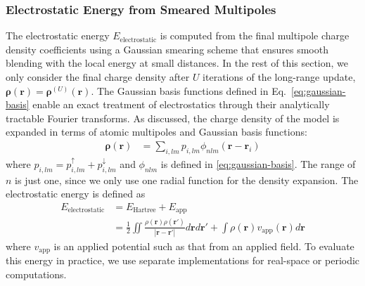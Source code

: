 \documentclass[aps,%
superscriptaddress,
 amsmath,amssymb,
floatfix,
twocolumn
]{revtex4-2}
\begin{document}
\subsubsection{Electrostatic Energy from Smeared Multipoles}

The electrostatic energy $E_{\text{electrostatic}}$ is computed from the final multipole charge density coefficients using a Gaussian smearing scheme that ensures smooth blending with the local energy at small distances. In the rest of this section, we only consider the final charge density after $U$ iterations of the long-range update, $\mathbf{\rho}(\mathbf{r}) = \mathbf{\rho}^{(U)}(\mathbf{r})$. The Gaussian basis functions defined in Eq.~\ref{eq:gaussian-basis} enable an exact treatment of electrostatics through their analytically tractable Fourier transforms. As discussed, the charge density of the model is expanded in terms of atomic multipoles and Gaussian basis functions:
\begin{align}
\mathbf{\rho}(\mathbf{r}) &= \sum_{i,lm} p_{i,lm} \phi_{nlm}(\mathbf{r} - \mathbf{r}_i)
\end{align}
where $p_{i,lm} = p_{i,lm}^\uparrow + p_{i,lm}^\downarrow$ and $\phi_{nlm}$ is defined in \eqref{eq:gaussian-basis}. The range of $n$ is just one, since we only use one radial function for the density expansion. The electrostatic energy is defined as \begin{align}
    E_\text{electrostatic} &= E_\text{Hartree} + E_\text{app} \\
    &=\frac{1}{2}\iint \frac{\rho(\mathbf{r})\rho(\mathbf{r}')}{|\mathbf{r}-\mathbf{r}'|} d\mathbf{r} d\mathbf{r}' + \int \rho(\mathbf{r}) v_\text{app}(\mathbf{r}) d\mathbf{r}
\end{align}
where $v_\text{app}$ is an applied potential such as that from an applied field. To evaluate this energy in practice, we use separate implementations for real-space or periodic computations.
\end{document}
